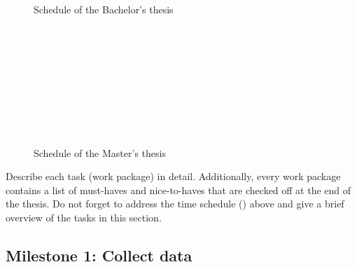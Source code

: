 \documentclass[expose, en]{thesis}
\begin{document}
{ %
  \begin{figure}[h!]
    \centering
    \begin{ganttchart}{1}{12}
       \\
       \\
       \\
       \\
       \\
       \\
       \\
    \end{ganttchart}
    \caption{Schedule of the Bachelor's thesis}
    \label{fig:timeschedule}
  \end{figure}
}
{%
  \begin{figure}[htbp]
    \centering
    \begin{ganttchart}{1}{24}
       \\
       \\
       \\
       \\
       \\
       \\
       \\
       \\
    \end{ganttchart}
    \caption{Schedule of the Master's thesis}
    \label{fig:timeschedule}
  \end{figure}
}

Describe each task (work package) in detail. Additionally, every work package
contains a list of must-haves and nice-to-haves that are checked off at the end
of the thesis. Do not forget to address the time schedule
() above and give a brief overview of the tasks in this
section.

\subsection{Milestone 1: Collect data}
\label{sec:milestone1}
\end{document}
